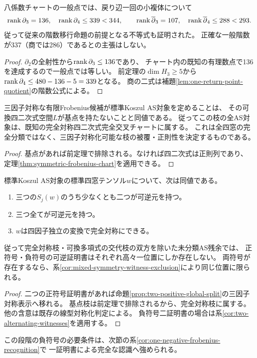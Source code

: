 \begin{corollary}[八変数階数に必要な上界]\label{cor:product-net-rank-bound}
八係数チャートの一般点では、戻り辺一回の小複体について
\[
 \operatorname{rank}\partial_3=136,\quad \operatorname{rank}\partial_4\leq339<344,
 \qquad
 \operatorname{rank}\overline\partial_3=107,\quad \operatorname{rank}\overline\partial_4\leq288<293.
\]
従って従来の階数移行命題の前提となる不等式も証明された。
正確な一般階数が337（商では286）であるとの主張はしない。
\end{corollary}
\begin{proof}
$\partial_2$の全射性から$\operatorname{rank}\partial_3\leq136$であり、
チャート内の既知の有理数点で136を達成するので一般点では等しい。
前定理の$\dim H_3\geq5$から
$\operatorname{rank}\partial_4\leq480-136-5=339$となる。
商の二式は補題\ref{lem:one-return-point-quotient}の階数公式による。
\end{proof}

\begin{corollary}[三因子対称枝の完全なAS条件]\label{cor:partial-symmetric-as-complete}
三因子対称な有限Frobenius候補が標準Koszul AS対象を定めることは、
その可換四二次式空間$L$が基点を持たないことと同値である。
従ってこの枝の全AS対象は、既知の完全対称四二次式完全交叉チャートに属する。
これは全四窓の完全分類ではなく、三因子対称化可能な枝の被覆・正則性を決定するものである。
\end{corollary}
\begin{proof}
基点があれば前定理で排除される。なければ四二次式は正則列であり、
定理\ref{thm:symmetric-frobenius-chart}を適用できる。
\end{proof}

\begin{corollary}[AS対象の対称認識には二証明書で十分]
\label{cor:two-positive-as-recognition}
標準Koszul AS対象の標準四窓テンソル$w$について、次は同値である。
\begin{enumerate}
\item 三つの$S_j(w)$のうち少なくとも二つが可逆元を持つ。
\item 三つ全てが可逆元を持つ。
\item $w$は四因子独立の変換で完全対称にできる。
\end{enumerate}
従って完全対称枝・可換多項式の交代枝の双方を除いた未分類AS残余では、
正符号・負符号の可逆証明書はそれぞれ高々一位置にしか存在しない。
両符号が存在するなら、系\ref{cor:mixed-symmetry-witness-exclusion}により同じ位置に限られる。
\end{corollary}
\begin{proof}
二つの正符号証明書があれば命題\ref{prop:two-positive-global-split}の三因子対称表示へ移れる。
基点枝は前定理で排除されるから、完全対称枝に属する。
他の含意は既存の線型対称化判定による。
負符号二証明書の場合は系\ref{cor:two-alternating-witnesses}を適用する。
\end{proof}
この段階の負符号の必要条件は、次節の系\ref{cor:one-negative-frobenius-recognition}で
一証明書による完全な認識へ強められる。


